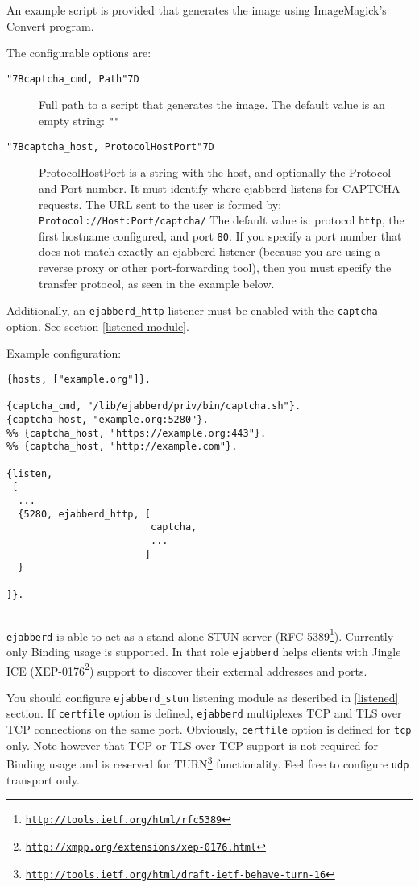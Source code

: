\documentclass[a4paper,10pt]{book}
\newcommand{\ind}[1]{\begin{latexonly}\index{#1}\end{latexonly}}
\newcommand{\makesubsection}[2]{ \aname{#1}{} \subsection{\ahrefloc{#1}{#2}} \label{#1} }
\newcommand{\bracehack}{\def\{{\char"7B}\def\}{\char"7D}}
\newcommand{\titem}[1]{\item[\bracehack\texttt{#1}]}
\newcommand{\option}[1]{\texttt{#1}}
\newcommand{\term}[1]{\texttt{#1}}
\newcommand{\ejabberd}{\texttt{ejabberd}}
\gdef\footahref#1#2{#2\footnote{\href{#1}{\texttt{#1}}}}
\newcommand{\txepref}[2]{\footahref{http://xmpp.org/extensions/xep-#1.html}{#2}}
\newcommand{\xepref}[1]{\txepref{#1}{XEP-#1}}
\begin{document}
An example script is provided that generates the image
using ImageMagick's Convert program.

The configurable options are:
\begin{description}
  \titem{\{captcha\_cmd, Path\}} 
  Full path to a script that generates the image.
  The default value is an empty string: \term{""}
  \titem{\{captcha\_host, ProtocolHostPort\}} 
  ProtocolHostPort is a string with the host, and optionally the Protocol and Port number.
  It must identify where ejabberd listens for CAPTCHA requests.
  The URL sent to the user is formed by: \term{Protocol://Host:Port/captcha/}
  The default value is: protocol \term{http}, the first hostname configured, and port \term{80}.
  If you specify a port number that does not match exactly an ejabberd listener
  (because you are using a reverse proxy or other port-forwarding tool),
  then you must specify the transfer protocol, as seen in the example below.
\end{description}

Additionally, an \term{ejabberd\_http} listener must be enabled with the \term{captcha} option.
See section \ref{listened-module}.

Example configuration:
\begin{verbatim}
{hosts, ["example.org"]}.

{captcha_cmd, "/lib/ejabberd/priv/bin/captcha.sh"}.
{captcha_host, "example.org:5280"}.
%% {captcha_host, "https://example.org:443"}.
%% {captcha_host, "http://example.com"}.

{listen,
 [
  ...
  {5280, ejabberd_http, [
                         captcha,
                         ...
                        ]
  }

]}.
\end{verbatim}

\makesubsection{stun}{STUN}
\ind{options!stun}\ind{stun}

\ejabberd{} is able to act as a stand-alone STUN server
(\footahref{http://tools.ietf.org/html/rfc5389}{RFC 5389}). Currently only Binding usage
is supported. In that role \ejabberd{} helps clients with Jingle ICE (\xepref{0176}) support to discover their external addresses and ports.

You should configure \term{ejabberd\_stun} listening module as described in \ref{listened} section.
If \option{certfile} option is defined, \ejabberd{} multiplexes TCP and
TLS over TCP connections on the same port. Obviously, \option{certfile} option
is defined for \term{tcp} only. Note however that TCP or TLS over TCP
support is not required for Binding usage and is reserved for
\footahref{http://tools.ietf.org/html/draft-ietf-behave-turn-16}{TURN}
functionality. Feel free to configure \term{udp} transport only.
\end{document}

